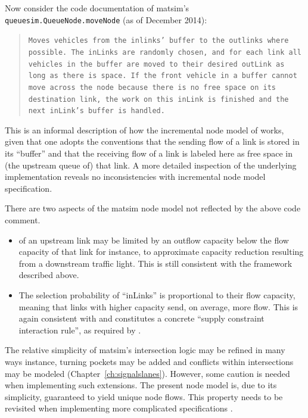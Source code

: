 Now consider the code documentation of \gls{matsim}'s \lstinline|queuesim.QueueNode.moveNode|
(as of December 2014):
\begin{quote}
\noindent \texttt{Moves vehicles from the inlinks' buffer to the outlinks
where possible. The inLinks are randomly chosen, and for each link
all vehicles in the buffer are moved to their desired outLink as long
as there is space. If the front vehicle in a buffer cannot move
across the node because there is no free space on its destination
link, the work on this inLink is finished and the next inLink's buffer
is handled.}
\end{quote}
This is an informal description of how the incremental node model
of \citet{floetteroed-2011a} works, given that one adopts the conventions
that the sending flow of a link is stored in its {}``buffer'' and
that the receiving flow of a link is labeled here as free space
in (the upstream queue of) that link. A more detailed inspection of
the underlying implementation reveals no inconsistencies
with incremental node model specification.

There are two aspects of the \gls{matsim} node model  not
reflected by the above code comment.
\begin{itemize}\styleItemize
\item {} of an upstream link may be limited
by  an outflow capacity below the flow capacity 
of that link\corr{:}{;} for instance, to approximate  capacity
reduction resulting from a downstream traffic light. This is still consistent with the
framework described above.
\item The selection probability of {}``inLinks'' is proportional to their
flow capacity, meaning that links with higher capacity send, on average,
more flow. This is again consistent with \citet{floetteroed-2011a}
and constitutes a concrete {}``supply constraint interaction rule'',
as required by \citet{tampere-2010b}.
\end{itemize}
The relative simplicity of \gls{matsim}'s intersection logic may be refined
in many ways instance, turning pockets may be added and
conflicts within intersections may be modeled (\cf Chapter~\ref{ch:signalslanes}). 
However, some caution is needed when implementing such extensions.
The present node model is, due to its simplicity, guaranteed to yield
unique node flows. This property needs to be revisited when 
implementing more complicated specifications \citep{corthout-2012}.
 
